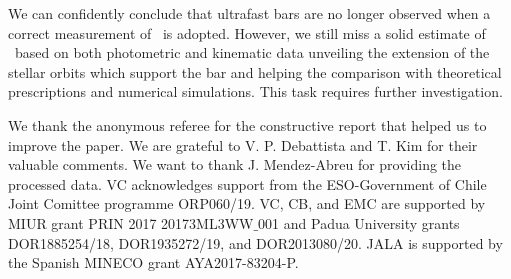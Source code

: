 \documentclass{aa}
\begin{document}
We can confidently conclude that ultrafast bars are no longer observed when a correct measurement of \rbar\ is adopted. However, we still miss a solid estimate of \rbar\ based on both photometric and kinematic data unveiling the extension of the stellar orbits which support the bar and helping the comparison with theoretical prescriptions and numerical simulations. This task requires further investigation.

\begin{acknowledgements}
We thank the anonymous referee for the constructive report that helped us to improve the paper. We are grateful to V. P. Debattista and T. Kim for their valuable comments. We want to thank J. Mendez-Abreu for providing the processed data. VC acknowledges support from the ESO-Government of Chile Joint Comittee programme ORP060/19. VC, CB, and EMC are supported by MIUR grant PRIN 2017 20173ML3WW$\_$001 and Padua University grants DOR1885254/18, DOR1935272/19, and DOR2013080/20. JALA is supported by the Spanish MINECO grant AYA2017-83204-P. 
\end{acknowledgements}
\end{document}
